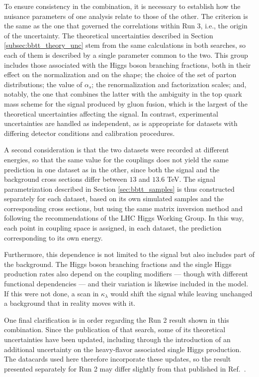 To ensure consistency in the combination, it is necessary to establish how the nuisance parameters of one analysis relate to those of the other. The criterion is the same as the one that governed the correlations within Run 3, i.e., the origin of the uncertainty. The theoretical uncertainties described in Section \ref{subsec:bbtt_theory_unc} stem from the same calculations in both searches, so each of them is described by a single parameter common to the two. This group includes those associated with the Higgs boson branching fractions, both in their effect on the normalization and on the shape; the choice of the set of parton distributions; the value of $\alpha_s$; the renormalization and factorization scales; and, notably, the one that combines the latter with the ambiguity in the top quark mass scheme for the signal produced by gluon fusion, which is the largest of the theoretical uncertainties affecting the signal. In contrast, experimental uncertainties are handled as independent, as is appropriate for datasets with differing detector conditions and calibration procedures.\medskip

A second consideration is that the two datasets were recorded at different energies, so that the same value for the couplings does not yield the same prediction in one dataset as in the other, since both the signal and the background cross sections differ between $13$ and $13.6$ TeV. The signal parametrization described in Section \ref{sec:bbtt_samples} is thus constructed separately for each dataset, based on its own simulated samples and the corresponding cross sections, but using the same matrix inversion method and following the recommendations of the LHC Higgs Working Group. In this way, each point in coupling space is assigned, in each dataset, the prediction corresponding to its own energy.

Furthermore, this dependence is not limited to the signal but also includes part of the background. The Higgs boson branching fractions and the single Higgs production rates also depend on the coupling modifiers — though with different functional dependencies — and their variation is likewise included in the model. If this were not done, a scan in $\kappa_\lambda$ would shift the signal while leaving unchanged a background that in reality moves with it.\medskip

One final clarification is in order regarding the Run 2 result shown in this combination. Since the publication of that search, some of its theoretical uncertainties have been updated, including through the introduction of an additional uncertainty on the heavy-flavor associated single Higgs production. The datacards used here therefore incorporate these updates, so the result presented separately for Run 2 may differ slightly from that published in Ref.~\cite{CMS-HIG-20-010}.

